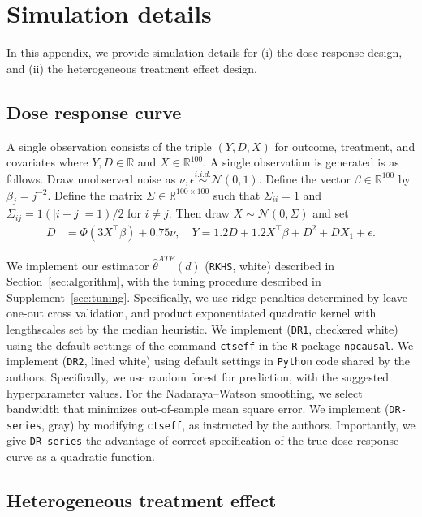 \section{Simulation details}\label{sec:simulations}

In this appendix, we provide simulation details for (i) the dose response design, and (ii) the heterogeneous treatment effect design.

\subsection{Dose response curve}

A single observation consists of the triple $(Y,D,X)$ for outcome, treatment, and covariates where $Y,D\in\mathbb{R}$ and $X\in\mathbb{R}^{100}$. A single observation is generated is as follows. Draw unobserved noise as $\nu,\epsilon \overset{i.i.d.}{\sim}\mathcal{N}(0,1)$. Define the vector $\beta\in\mathbb{R}^{100}$ by $\beta_j=j^{-2}$. Define the matrix $\Sigma\in\mathbb{R}^{100\times 100}$ such that $\Sigma_{ii}=1$ and $\Sigma_{ij}=1(|i-j|=1)/2$ for $i\neq j$. Then draw $X\sim\mathcal{N}(0,\Sigma)$ and set
\begin{align*}
    D&=\Phi(3X^{\top}\beta)+0.75\nu,\quad 
    Y=1.2D+1.2X^{\top}\beta+D^2+DX_1+\epsilon.
\end{align*}

We implement our estimator $\hat{\theta}^{ATE}(d)$ (\texttt{RKHS}, white) described in Section~\ref{sec:algorithm}, with the tuning procedure described in Supplement~\ref{sec:tuning}. Specifically, we use ridge penalties determined by leave-one-out cross validation, and product exponentiated quadratic kernel with lengthscales set by the median heuristic. We implement \cite{kennedy2017nonparametric} (\texttt{DR1}, checkered white) using the default settings of the command \texttt{ctseff} in the \texttt{R} package \texttt{npcausal}. We implement \cite{colangelo2020double} (\texttt{DR2}, lined white) using default settings in \texttt{Python} code shared by the authors. Specifically, we use random forest for prediction, with the suggested hyperparameter values. For the Nadaraya--Watson smoothing, we select bandwidth that minimizes out-of-sample mean square error. We implement \cite{semenova2021debiased} (\texttt{DR-series}, gray) by modifying \texttt{ctseff}, as instructed by the authors. Importantly, we give \texttt{DR-series} the advantage of correct specification of the true dose response curve as a quadratic function.


\subsection{Heterogeneous treatment effect}

